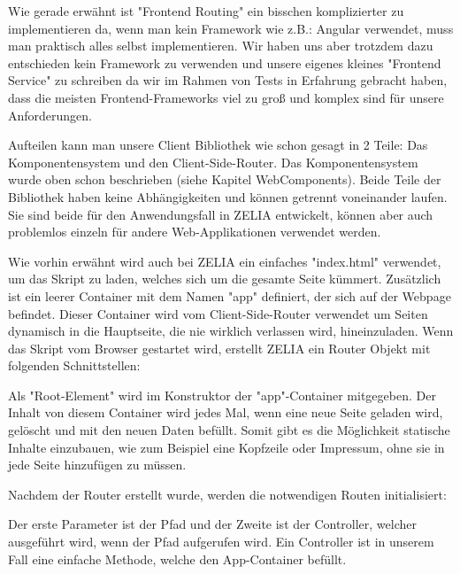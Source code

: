 
Wie gerade erwähnt ist "Frontend Routing" ein bisschen komplizierter zu implementieren da, wenn man kein Framework wie z.B.: Angular verwendet, muss man praktisch alles selbst implementieren. Wir haben uns aber trotzdem dazu entschieden kein Framework zu verwenden und unsere eigenes kleines "Frontend Service" zu schreiben da wir im Rahmen von Tests  in Erfahrung gebracht haben, dass die meisten Frontend-Frameworks viel zu groß und komplex sind für unsere Anforderungen.

Aufteilen kann man unsere Client Bibliothek wie schon gesagt in 2 Teile: Das Komponentensystem und den Client-Side-Router. Das Komponentensystem wurde oben schon beschrieben (siehe Kapitel WebComponents). Beide Teile der Bibliothek haben keine Abhängigkeiten und können getrennt voneinander laufen. Sie sind beide für den Anwendungsfall in ZELIA entwickelt, können aber auch problemlos einzeln für andere Web-Applikationen verwendet werden.

Wie vorhin erwähnt wird auch bei ZELIA ein einfaches "index.html" verwendet, um das Skript zu laden, welches sich um die gesamte Seite kümmert. Zusätzlich ist ein leerer Container mit dem Namen "app" definiert, der sich auf der Webpage befindet. Dieser Container wird vom Client-Side-Router verwendet um Seiten dynamisch in die Hauptseite, die nie wirklich verlassen wird, hineinzuladen. Wenn das Skript vom Browser gestartet wird, erstellt ZELIA ein Router Objekt mit folgenden Schnittstellen:


Als "Root-Element" wird im Konstruktor der "app"-Container mitgegeben. Der Inhalt von diesem Container wird jedes Mal, wenn eine neue Seite geladen wird, gelöscht und mit den neuen Daten befüllt. Somit gibt es die Möglichkeit statische Inhalte einzubauen, wie zum Beispiel eine Kopfzeile oder Impressum, ohne sie in jede Seite hinzufügen zu müssen.

Nachdem der Router erstellt wurde, werden die notwendigen Routen initialisiert:



Der erste Parameter ist der Pfad und der Zweite ist der Controller, welcher ausgeführt wird, wenn der Pfad aufgerufen wird. Ein Controller ist in unserem Fall eine einfache Methode, welche den App-Container befüllt.

